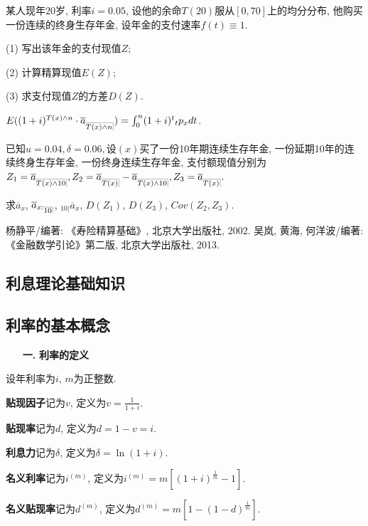 \documentclass[a4paper,10pt]{ctexbook}
\makeatletter
\newcommand{\hei}{\CJKfamily{hei}}      %
\DeclareRobustCommand{\annu}[1]{_{%
    \def\arraystretch{0}%
    \setlength\arraycolsep{1pt}%
    \setlength\arrayrulewidth{.2pt}%
    \begin{array}[b]{@{}c|}\hline
        \\[\arraycolsep]%
        \scriptstyle #1%
    \end{array}%
}}
\makeatother
\begin{document}
\begin{exs}
    某人现年$20$岁, 利率$i = 0.05$, 设他的余命$T(20)$服从$[0, 70]$上的均分分布, 他购买一份连续的终身生存年金, 设年金的支付速率$f(t) \equiv 1$.

    (1) 写出该年金的支付现值$Z$;

    (2) 计算精算现值$E(Z)$;

    (3) 求支付现值$Z$的方差$D(Z)$.
\end{exs}

\begin{exs}
    \proof $E((1+i)^{T(x)\wedge n}\cdot \overline{a}_{\annu{T(x)\wedge n}})=\int_0^{n} (1+i)^{t}{}_tp_xdt$.
\end{exs}

\begin{exs}
    已知$u=0.04, \delta=0.06, $设$(x)$买了一份10年期连续生存年金, 一份延期10年的连续终身生存年金, 一份终身连续生存年金, 支付额现值分别为$Z_1=\overline a_{\annu {T(x) \land 10}},Z_2=\overline a_{\annu {T(x) }}-\overline a_{\annu {T(x) \land 10}}, Z_3=\overline a_{\annu {T(x) }}.$

    求$\overline a_{x}$, $\overline a_{{x:\annu{10}}}$, $_{10|}\overline{a}_{x}$, $D(Z_1)$, $D(Z_3)$, $Cov(Z_2,Z_3)$.
\end{exs}

\begin{thebibliography}{99}
    杨静平/编著: 《寿险精算基础》, 北京大学出版社, 2002.
     吴岚, 黄海, 何洋波/编著: 《金融数学引论》第二版, 北京大学出版社, 2013.

\end{thebibliography}

\begin{appendix}
    \chapter{利息理论基础知识}
    \section{利率的基本概念}
    \begin{itemize}
        \item[{\bf\hei 一.}]{\bf\hei 利率的定义}
    \end{itemize}

    设年利率为$i$, $m$为正整数.

    \textbf{贴现因子}记为$v$, 定义为$v=\frac{1}{1+i}$.

    \textbf{贴现率}记为$d$, 定义为$d=1-v=i$.

    \textbf{利息力}记为$\delta$, 定义为$\delta=\ln(1+i)$.

    \textbf{名义利率}记为$i^{(m)}$, 定义为$i^{(m)}=m[(1+i)^{\frac{1}{m}}-1]$.

    \textbf{名义贴现率}记为$d^{(m)}$, 定义为$d^{(m)}=m[1-(1-d)^{\frac{1}{m}}]$.
\end{appendix}
\end{document}
